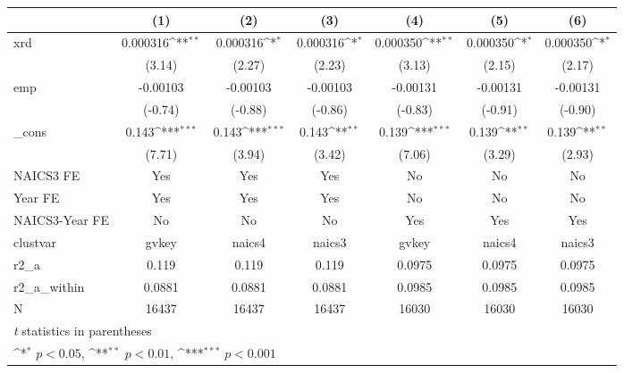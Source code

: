 {
\def\sym#1{\ifmmode^{#1}\else\(^{#1}\)\fi}
\begin{tabular}{l*{6}{c}}
\hline\hline
            &\multicolumn{1}{c}{(1)}         &\multicolumn{1}{c}{(2)}         &\multicolumn{1}{c}{(3)}         &\multicolumn{1}{c}{(4)}         &\multicolumn{1}{c}{(5)}         &\multicolumn{1}{c}{(6)}         \\
\hline
xrd         &    0.000316\sym{**} &    0.000316\sym{*}  &    0.000316\sym{*}  &    0.000350\sym{**} &    0.000350\sym{*}  &    0.000350\sym{*}  \\
            &      (3.14)         &      (2.27)         &      (2.23)         &      (3.13)         &      (2.15)         &      (2.17)         \\
[1em]
emp         &    -0.00103         &    -0.00103         &    -0.00103         &    -0.00131         &    -0.00131         &    -0.00131         \\
            &     (-0.74)         &     (-0.88)         &     (-0.86)         &     (-0.83)         &     (-0.91)         &     (-0.90)         \\
[1em]
\_cons      &       0.143\sym{***}&       0.143\sym{***}&       0.143\sym{**} &       0.139\sym{***}&       0.139\sym{**} &       0.139\sym{**} \\
            &      (7.71)         &      (3.94)         &      (3.42)         &      (7.06)         &      (3.29)         &      (2.93)         \\
[1em]
NAICS3 FE   &         Yes         &         Yes         &         Yes         &          No         &          No         &          No         \\
[1em]
Year FE     &         Yes         &         Yes         &         Yes         &          No         &          No         &          No         \\
[1em]
NAICS3-Year FE&          No         &          No         &          No         &         Yes         &         Yes         &         Yes         \\
\hline
clustvar    &       gvkey         &      naics4         &      naics3         &       gvkey         &      naics4         &      naics3         \\
r2\_a        &       0.119         &       0.119         &       0.119         &      0.0975         &      0.0975         &      0.0975         \\
r2\_a\_within &      0.0881         &      0.0881         &      0.0881         &      0.0985         &      0.0985         &      0.0985         \\
N           &       16437         &       16437         &       16437         &       16030         &       16030         &       16030         \\
\hline\hline
\multicolumn{7}{l}{\footnotesize \textit{t} statistics in parentheses}\\
\multicolumn{7}{l}{\footnotesize \sym{*} \(p<0.05\), \sym{**} \(p<0.01\), \sym{***} \(p<0.001\)}\\
\end{tabular}
}
